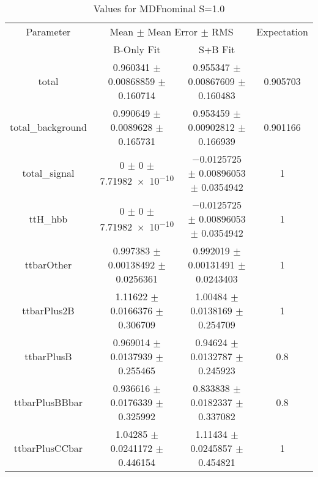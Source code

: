 \begin{table}
\centering
\caption{Values for MDFnominal S=1.0}
\begin{tabular}{cccc}
\toprule
Parameter & \multicolumn{2}{c}{Mean $\pm$ Mean Error $\pm$ RMS} & Expectation\\
 & B-Only Fit & S+B Fit & \\
\midrule
total & \num{0.960341} $\pm$ \num{0.00868859} $\pm$ \num{0.160714} & \num{0.955347} $\pm$ \num{0.00867609} $\pm$ \num{0.160483} & \num{0.905703}\\
total\_background & \num{0.990649} $\pm$ \num{0.0089628} $\pm$ \num{0.165731} & \num{0.953459} $\pm$ \num{0.00902812} $\pm$ \num{0.166939} & \num{0.901166}\\
total\_signal & \num{0} $\pm$ \num{0} $\pm$ \num{7.71982e-10} & \num{-0.0125725} $\pm$ \num{0.00896053} $\pm$ \num{0.0354942} & \num{1}\\
ttH\_hbb & \num{0} $\pm$ \num{0} $\pm$ \num{7.71982e-10} & \num{-0.0125725} $\pm$ \num{0.00896053} $\pm$ \num{0.0354942} & \num{1}\\
ttbarOther & \num{0.997383} $\pm$ \num{0.00138492} $\pm$ \num{0.0256361} & \num{0.992019} $\pm$ \num{0.00131491} $\pm$ \num{0.0243403} & \num{1}\\
ttbarPlus2B & \num{1.11622} $\pm$ \num{0.0166376} $\pm$ \num{0.306709} & \num{1.00484} $\pm$ \num{0.0138169} $\pm$ \num{0.254709} & \num{1}\\
ttbarPlusB & \num{0.969014} $\pm$ \num{0.0137939} $\pm$ \num{0.255465} & \num{0.94624} $\pm$ \num{0.0132787} $\pm$ \num{0.245923} & \num{0.8}\\
ttbarPlusBBbar & \num{0.936616} $\pm$ \num{0.0176339} $\pm$ \num{0.325992} & \num{0.833838} $\pm$ \num{0.0182337} $\pm$ \num{0.337082} & \num{0.8}\\
ttbarPlusCCbar & \num{1.04285} $\pm$ \num{0.0241172} $\pm$ \num{0.446154} & \num{1.11434} $\pm$ \num{0.0245857} $\pm$ \num{0.454821} & \num{1}\\
\bottomrule
\end{tabular}
\end{table}